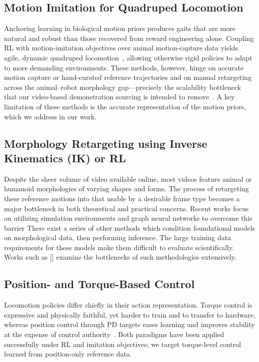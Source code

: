 \documentclass{article}
\theoremstyle{plain}
\theoremstyle{definition}
\theoremstyle{remark}
\begin{document}
\subsection{Motion Imitation for Quadruped Locomotion}
Anchoring learning in biological motion priors produces gaits that are more
natural and robust than those recovered from reward engineering alone. Coupling
RL with motion-imitation objectives over animal motion-capture data yields agile,
dynamic quadruped locomotion~\cite{peng2018deepmimic,
peng2020learningagileroboticlocomotion}, allowing otherwise rigid policies to
adapt to more demanding environments. These methods, however, hinge on accurate
motion capture or hand-curated reference trajectories and on manual retargeting
across the animal--robot morphology gap---precisely the scalability bottleneck
that our video-based demonstration sourcing is intended to
remove~\cite{zare2023surveyimitationlearningalgorithms, NIPS2016_cc7e2b87}.
A key limitation of these methods is the accurate representation of the motion priors,
which we address in our work.

\subsection{Morphology Retargeting using Inverse Kinematics (IK) or RL}
Despite the sheer volume of video available online, most videos feature animal or
humanoid morphologies of varying shapes and forms. The process of retargeting these
reference motions into that usable by a desirable frame type becomes a major bottleneck
in both theoretical and practical concerns. Recent works focus on utilizing simulation
environments and graph neural networks to overcome this barrier %
There exist a series of other methods which condition foundational models on morphological 
data, then performing inference. The large training data requirements for these models make
them difficult to evaluate scientifically. Works such as [] examine the bottlenecks of such
methodologies extensively.

\subsection{Position- and Torque-Based Control}
Locomotion policies differ chiefly in their action representation. Torque control
is expressive and physically faithful, yet harder to train and to transfer to
hardware, whereas position control through PD targets eases learning and improves
stability at the expense of control
authority~\cite{chen2023learningtorquecontrolquadrupedal}. Both paradigms have
been applied successfully under RL and imitation objectives; we target
torque-level control learned from position-only reference data.
\end{document}
